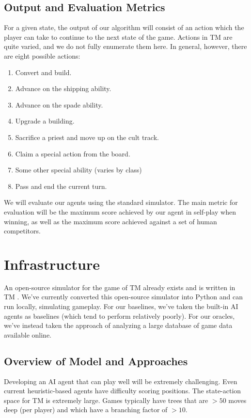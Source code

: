 \documentclass[10pt,twocolumn,letterpaper]{article}
\begin{document}
\subsection{Output and Evaluation Metrics}
For a given state, the output of our algorithm will consist of an action which the player can take to continue to the next state of the game. Actions in TM are quite varied, and we do not fully enumerate them here. In general, however, there are eight possible actions:
\begin{enumerate}
    \item Convert and build.
    \item Advance on the shipping ability.
    \item Advance on the spade ability.
    \item Upgrade a building.
    \item Sacrifice a priest and move up on the cult track.
    \item Claim a special action from the board.
    \item Some other special ability (varies by class)
    \item Pass and end the current turn.
\end{enumerate}

We will evaluate our agents using the standard simulator. The main metric for evaluation will be the maximum score achieved by our agent in self-play when winning, as well as the maximum score achieved against a set of human competitors.

\section{Infrastructure}
An open-source simulator for the game of TM already exists and is written in TM \cite{infra}. We've currently converted this open-source simulator into Python and can run locally, simulating gameplay. For our baselines, we've taken the built-in AI agents as baselines (which tend to perform relatively poorly). For our oracles, we've instead taken the approach of analyzing a large database of game data available online.

\subsection{Overview of Model and Approaches}
Developing an AI agent that can play well will be extremely challenging. Even current heuristic-based agents have difficulty scoring positions. The state-action space for TM is extremely large. Games typically have trees that are $>50$ moves deep (per player) and which have a branching factor of $>10$. 
\end{document}
